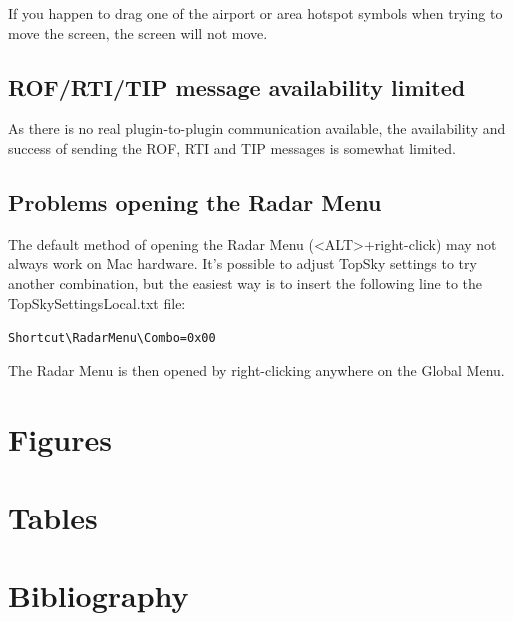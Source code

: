 \documentclass[a4paper,oneside,11pt]{memoir}
\begin{document}
If you happen to drag one of the airport or area hotspot symbols when trying to move the screen, the screen will not move.

\section{ROF/RTI/TIP message availability limited}

As there is no real plugin-to-plugin communication available, the availability and success of sending the ROF, RTI and TIP messages is somewhat limited.

\section{Problems opening the Radar Menu}

The default method of opening the Radar Menu (<ALT>+right-click) may not always work on Mac hardware. It’s possible to adjust TopSky settings to try another combination, but the easiest way is to insert the following line to the TopSkySettingsLocal.txt file:

\verb|Shortcut\RadarMenu\Combo=0x00|

The Radar Menu is then opened by right-clicking anywhere on the Global Menu.

\appendix

\chapter{Figures}

\begin{KeepFromToc}
\listoffigures
\end{KeepFromToc}

\chapter{Tables}

\begin{KeepFromToc}
\listoftables
\end{KeepFromToc}

\chapter{Bibliography}
\begin{KeepFromToc}
\nocite{*}
\printbibliography
\end{KeepFromToc}
\end{document}

